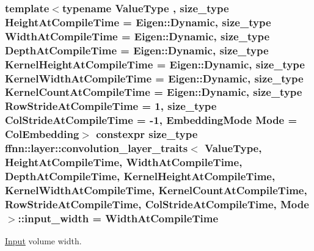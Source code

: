 \hypertarget{structffnn_1_1layer_1_1convolution__layer__traits_aeb9e3903c86bc692b6cee14434537e46}{
\subsubsection[{input\-\_\-width}]{\setlength{\rightskip}{0pt plus 5cm}template$<$typename Value\-Type , size\-\_\-type Height\-At\-Compile\-Time = Eigen\-::\-Dynamic, size\-\_\-type Width\-At\-Compile\-Time = Eigen\-::\-Dynamic, size\-\_\-type Depth\-At\-Compile\-Time = Eigen\-::\-Dynamic, size\-\_\-type Kernel\-Height\-At\-Compile\-Time = Eigen\-::\-Dynamic, size\-\_\-type Kernel\-Width\-At\-Compile\-Time = Eigen\-::\-Dynamic, size\-\_\-type Kernel\-Count\-At\-Compile\-Time = Eigen\-::\-Dynamic, size\-\_\-type Row\-Stride\-At\-Compile\-Time = 1, size\-\_\-type Col\-Stride\-At\-Compile\-Time = -\/1, Embedding\-Mode Mode = Col\-Embedding$>$ constexpr {\bf size\-\_\-type} {\bf ffnn\-::layer\-::convolution\-\_\-layer\-\_\-traits}$<$ Value\-Type, Height\-At\-Compile\-Time, Width\-At\-Compile\-Time, Depth\-At\-Compile\-Time, Kernel\-Height\-At\-Compile\-Time, Kernel\-Width\-At\-Compile\-Time, Kernel\-Count\-At\-Compile\-Time, Row\-Stride\-At\-Compile\-Time, Col\-Stride\-At\-Compile\-Time, Mode $>$\-::input\-\_\-width = Width\-At\-Compile\-Time\hspace{0.3cm}{\ttfamily [static]}}}\label{structffnn_1_1layer_1_1convolution__layer__traits_aeb9e3903c86bc692b6cee14434537e46}


\hyperlink{classffnn_1_1layer_1_1_input}{Input} volume width. 


